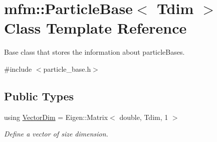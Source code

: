 \hypertarget{classmfm_1_1_particle_base}{}\section{mfm\+:\+:Particle\+Base$<$ Tdim $>$ Class Template Reference}
\label{classmfm_1_1_particle_base}


Base class that stores the information about particle\+Bases.  




{\ttfamily \#include $<$particle\+\_\+base.\+h$>$}

\subsection*{Public Types}
\begin{DoxyCompactItemize}
\item 
\mbox{\label{classmfm_1_1_particle_base_afbf037646f60380710274aeddce74480}} 
using \hyperlink{classmfm_1_1_particle_base_afbf037646f60380710274aeddce74480}{Vector\+Dim} = Eigen\+::\+Matrix$<$ double, Tdim, 1 $>$
\begin{DoxyCompactList}\small\item\em Define a vector of size dimension. \end{DoxyCompactList}\end{DoxyCompactItemize}
